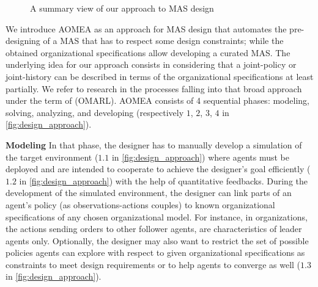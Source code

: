 \documentclass[runningheads]{llncs}
\begin{document}
\begin{figure}[t!]
    \centering
    
    \caption{A summary view of our approach to MAS design}
    \label{fig:design_approach}
\end{figure}

We introduce AOMEA as an approach for MAS design that automates the pre-designing of a MAS that has to respect some design constraints; while the obtained organizational specifications allow developing a curated MAS.
The underlying idea for our approach consists in considering that a joint-policy or joint-history can be described in terms of the organizational specifications at least partially.
We refer to research in the processes falling into that broad approach under the term of  (OMARL).
%
%
AOMEA consists of 4 sequential phases: modeling, solving, analyzing, and developing (respectively $1$, $2$, $3$, $4$ in \autoref{fig:design_approach}).

\textbf{Modeling} \quad In that phase, the designer has to manually develop a simulation of the target environment ($1.1$ in \autoref{fig:design_approach}) where agents must be deployed and are intended to cooperate to achieve the designer's goal efficiently ($1.2$ in \autoref{fig:design_approach}) with the help of quantitative feedbacks. During the development of the simulated environment, the designer can link parts of an agent's policy (as observations-actions couples) to known organizational specifications of any chosen organizational model.
For instance, in  organizations, the actions sending orders to other follower agents, are characteristics of leader agents only.
Optionally, the designer may also want to restrict the set of possible policies agents can explore with respect to given organizational specifications as constraints to meet design requirements or to help agents to converge as well ($1.3$ in \autoref{fig:design_approach}).
\end{document}
